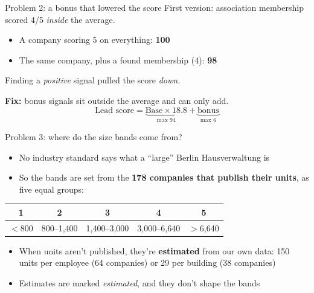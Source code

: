 \documentclass[aspectratio=169,11pt]{beamer}
\begin{document}
\begin{frame}{Problem 2: a bonus that lowered the score}
  First version: association membership scored 4/5 \emph{inside} the average.
  \vspace{0.4em}
  \begin{itemize}
    \item A company scoring 5 on everything: \textbf{100}
    \item The same company, plus a found membership (4): \textcolor{bad}{\textbf{98}}
  \end{itemize}
  Finding a \emph{positive} signal pulled the score \emph{down}.
  \vspace{0.6em}

  \textbf{Fix:} bonus signals sit outside the average and can only add.
  \[
  \text{Lead score} = \underbrace{\text{Base} \times 18.8}_{\text{max } 94} +
  \underbrace{\text{bonus}}_{\text{max } 6}
  \]
\end{frame}

\begin{frame}{Problem 3: where do the size bands come from?}
  \begin{itemize}
    \item No industry standard says what a ``large'' Berlin Hausverwaltung is
    \item So the bands are set from the \textbf{178 companies that publish their units}, as
          five equal groups:
  \end{itemize}
  \begin{center}
  \begin{tabular}{ccccc}
    \toprule
    1 & 2 & 3 & 4 & 5 \\
    \midrule
    $<$800 & 800--1,400 & 1,400--3,000 & 3,000--6,640 & $>$6,640 \\
    \bottomrule
  \end{tabular}
  \end{center}
  \begin{itemize}
    \item When units aren't published, they're \textbf{estimated} from our own data: 150 units
          per employee (64 companies) or 29 per building (38 companies)
    \item Estimates are marked \emph{estimated}, and they don't shape the bands
  \end{itemize}
\end{frame}
\end{document}
